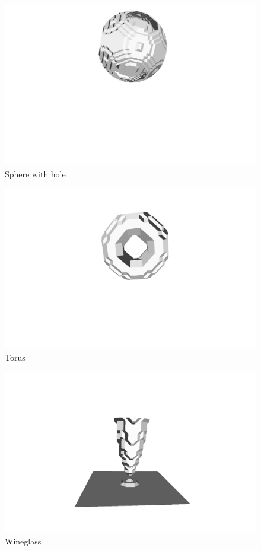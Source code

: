 \documentclass{article}
\begin{document}
\begin{figure}[h]
    \includegraphics[scale=0.3]{implicitMeshes/sphereWithHole.png}
    \caption{Sphere with hole}
    \end{figure}
    

\begin{figure}[h]
\includegraphics[scale=0.3]{implicitMeshes/torus.png}
\caption{Torus}
\end{figure}

\begin{figure}[h]
\includegraphics[scale=0.3]{implicitMeshes/wineglass.png}
\caption{Wineglass}
\end{figure}
\end{document}

